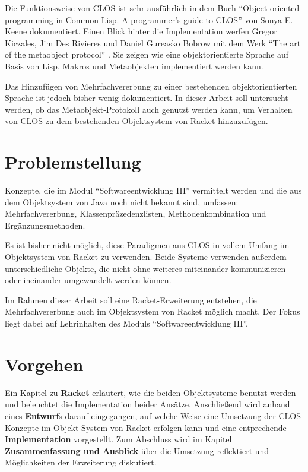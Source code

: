 Die Funktionsweise von CLOS ist sehr ausführlich in dem Buch ``Object-oriented programming in Common Lisp. A programmer's guide to CLOS'' von Sonya E. Keene \cite{keene} dokumentiert. Einen Blick hinter die Implementation werfen Gregor Kiczales, Jim Des Rivieres und Daniel Gureasko Bobrow mit dem Werk ``The art of the metaobject protocol'' \cite{amop}. Sie zeigen wie eine objektorientierte Sprache auf Basis von Lisp, Makros und Metaobjekten implementiert werden kann. 

Das Hinzufügen von Mehrfachvererbung zu einer bestehenden objektorientierten Sprache ist jedoch bisher wenig dokumentiert. In dieser Arbeit soll untersucht werden, ob das Metaobjekt-Protokoll auch genutzt werden kann, um Verhalten von CLOS zu dem bestehenden Objektsystem von Racket hinzuzufügen.

\section{Problemstellung} 

Konzepte, die im Modul ``Softwareentwicklung III'' vermittelt werden und die aus dem Objektsystem von Java noch nicht bekannt sind, umfassen: Mehrfachvererbung, Klassenpräzedenzlisten, Methodenkombination und Ergänzungsmethoden.

Es ist bisher nicht möglich, diese Paradigmen aus CLOS in vollem Umfang im Objektsystem von Racket zu verwenden. Beide Systeme verwenden außerdem unterschiedliche Objekte, die nicht ohne weiteres miteinander kommunizieren oder ineinander umgewandelt werden können.

Im Rahmen dieser Arbeit soll eine Racket-Erweiterung entstehen, die Mehrfachvererbung auch im Objektsystem von Racket möglich macht. Der Fokus liegt dabei auf Lehrinhalten des Moduls ``Softwareentwicklung III''.


\section{Vorgehen}
Ein Kapitel zu \textbf{Racket} erläutert, wie die beiden Objektsysteme benutzt werden und beleuchtet die Implementation beider Ansätze. Anschließend wird anhand eines \textbf{Entwurf}s darauf eingegangen, auf welche Weise eine Umsetzung der CLOS-Konzepte im Objekt-System von Racket erfolgen kann und eine entprechende \textbf{Implementation} vorgestellt. Zum Abschluss wird im Kapitel \textbf{Zusammenfassung und Ausblick} über die Umsetzung reflektiert und Möglichkeiten der Erweiterung diskutiert.